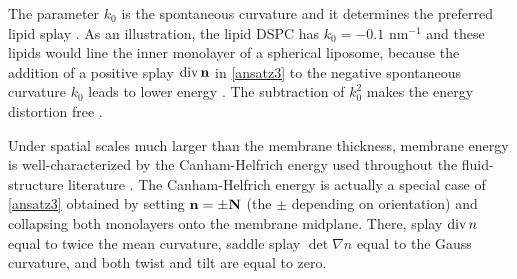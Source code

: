 The parameter $k_0$ is the  spontaneous curvature and it determines the preferred lipid splay \cite{RoLi15,Kozlov2007}. 
As an illustration, the lipid DSPC has $k_0 = -0.1$ nm$^{-1}$ 
and these lipids would line the  inner monolayer of a 
spherical liposome, because the addition of a positive splay $\operatorname{div} \mathbf{n}$  in \eqref{ansatz3}
to the negative spontaneous curvature $k_0$ leads to lower energy \cite{Kamal22245, C3SM51829A, RoLi15,FriedSeguin15}.
The subtraction of $k_0^2$ makes the energy distortion free
\cite{Helfrich73,PhysRevLett.113.248102,Hamm2000}.

Under spatial scales much larger than the
membrane thickness, membrane energy is well-characterized by the
Canham-Helfrich energy used throughout the fluid-structure literature
\cite{QiangDu09, Lowengrub07,KimLai2010_JCP, Hu, HuLaiSeolEtAl2016_JCP,
  qua-bir2014, qua-vee-you2019}.
The Canham-Helfrich energy is actually a special case of
\eqref{ansatz3} obtained by setting ${\bf n} =  \pm {\bf N}$ (the $\pm$ depending on
orientation) and collapsing both monolayers onto the membrane midplane.
There, splay $\operatorname{div} n$ equal to twice the mean curvature, saddle splay
$\det \nabla n$ equal to the Gauss curvature, and both twist and tilt
are equal to zero. 





